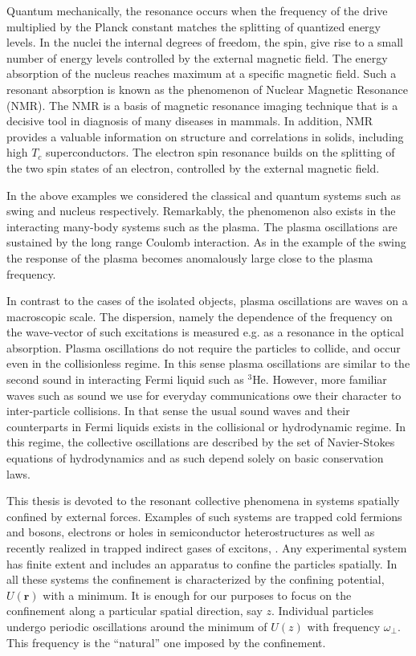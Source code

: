Quantum mechanically, the resonance occurs when the frequency of the drive multiplied by the Planck constant matches the splitting of quantized energy levels.
In the nuclei the internal degrees of freedom, the spin, give rise to a small number of energy levels controlled by the external magnetic field.
The energy absorption of the nucleus reaches maximum at a specific magnetic field.
Such a resonant absorption is known as the phenomenon of Nuclear Magnetic Resonance (NMR).
The NMR is a basis of magnetic resonance imaging technique that is a decisive tool in diagnosis of many diseases in mammals.
In addition, NMR provides a valuable information on structure and correlations in solids, including high $T_c$ superconductors. 
The electron spin resonance builds on the splitting of the two spin states of an electron, controlled by the external magnetic field.

In the above examples we considered the classical and quantum systems such as swing and nucleus respectively.
Remarkably, the phenomenon also exists in the interacting many-body systems such as the plasma.
The plasma oscillations are sustained by the long range Coulomb interaction.
As in the example of the swing the response of the plasma becomes anomalously large close to the plasma frequency.

In contrast to the cases of the isolated objects, plasma oscillations are waves on a macroscopic scale.
The dispersion, namely the dependence of the frequency on the wave-vector of such excitations is measured e.g. as a resonance in the optical absorption.  
Plasma oscillations do not require the particles to collide, and occur even in the collisionless regime.
In this sense plasma oscillations are similar to the second sound in interacting Fermi liquid such as $^3$He.
However, more familiar waves such as sound we use for everyday communications owe their character to inter-particle collisions.
In that sense the usual sound waves and their counterparts in Fermi liquids exists in the collisional or hydrodynamic regime.
In this regime, the collective oscillations are described by the set of Navier-Stokes equations of hydrodynamics and as such depend solely on basic conservation laws.

This thesis is devoted to the resonant collective phenomena in systems spatially confined by external forces.
Examples of such systems are trapped cold fermions and bosons, electrons or holes in semiconductor heterostructures as well as recently realized in trapped indirect gases of excitons, \cite{Haldane, Stone, Gogolin, butov2002, Giamarchi, combescot2007, Frolov2009, Review-1, Review-2, Review-3, shilo2013, stern2014}.
Any experimental system has finite extent and includes an apparatus to confine the particles spatially.
In all these systems the confinement is characterized by the confining potential, $U(\bm{r})$ with a minimum.
It is enough for our purposes to focus on the confinement along a particular spatial direction, say $z$.
Individual particles  undergo periodic oscillations around the minimum of $U(z)$ with frequency $\omega_{\perp}$.
This frequency is the ``natural'' one imposed by the confinement.

